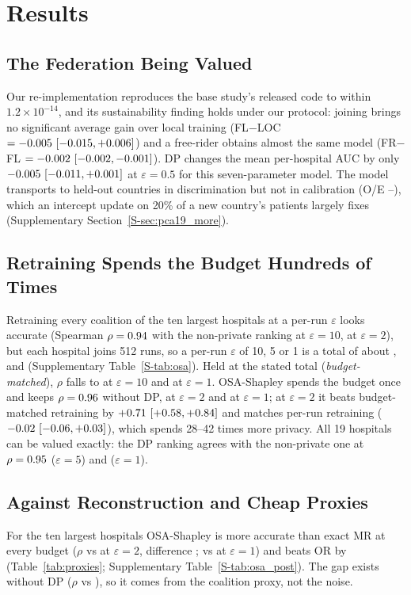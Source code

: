 \section{Results}
\label{sec:results}

\subsection{The Federation Being Valued}
\label{sec:federation}
Our re-implementation reproduces the base study's released code to within $1.2\times10^{-14}$, and its sustainability finding holds under our protocol: joining brings no significant average gain over local training (FL$-$LOC $=-0.005\ [-0.015, +0.006]$) and a free-rider obtains almost the same model (FR$-$FL $=-0.002\ [-0.002, -0.001]$). DP changes the mean per-hospital AUC by only $-0.005\ [-0.011, +0.001]$ at $\varepsilon=0.5$ for this seven-parameter model. The model transports to held-out countries in discrimination but not in calibration (O/E \pOeMin--\pOeMax), which an intercept update on 20\% of a new country's patients largely fixes (Supplementary Section~\ref{S-sec:pca19_more}).

\subsection{Retraining Spends the Budget Hundreds of Times}
\label{sec:p19_retrain}
\label{sec:p19_osa}
Retraining every coalition of the ten largest hospitals at a per-run $\varepsilon$ looks accurate (Spearman $\rho=0.94$ with the non-private ranking at $\varepsilon=10$, \pShRhoTwo{} at $\varepsilon=2$), but each hospital joins 512 runs, so a per-run $\varepsilon$ of 10, 5 or 1 is a total of about \trueEpsTen{}, \trueEpsFive{} and \trueEpsOne{} (Supplementary Table~\ref{S-tab:osa}). Held at the stated total (\emph{budget-matched}), $\rho$ falls to \bmRhoTen{} at $\varepsilon=10$ and \bmRhoOne{} at $\varepsilon=1$. OSA-Shapley spends the budget once and keeps $\rho=0.96$ without DP, \osaRhoTwo{} at $\varepsilon=2$ and \osaRhoOne{} at $\varepsilon=1$; at $\varepsilon=2$ it beats budget-matched retraining by $+0.71\ [+0.58, +0.84]$ and matches per-run retraining ($-0.02\ [-0.06, +0.03]$), which spends 28--42 times more privacy. All 19 hospitals can be valued exactly: the DP ranking agrees with the non-private one at $\rho=0.95$ ($\varepsilon=5$) and \osaNineRhoOne{} ($\varepsilon=1$).

\subsection{Against Reconstruction and Cheap Proxies}
\label{sec:p19_post}
\label{sec:p19_proxies}
For the ten largest hospitals OSA-Shapley is more accurate than exact MR at every budget ($\rho$ \osaRhoTwo{} vs \mrRhoTwo{} at $\varepsilon=2$, difference \osaVsMrTwo; \osaRhoOne{} vs \mrRhoOne{} at $\varepsilon=1$) and beats OR by \osaVsOrTwo{} (Table~\ref{tab:proxies}; Supplementary Table~\ref{S-tab:osa_post}). The gap exists without DP ($\rho$ \osaNoDP{} vs \mrRhoNoDP), so it comes from the coalition proxy, not the noise.

